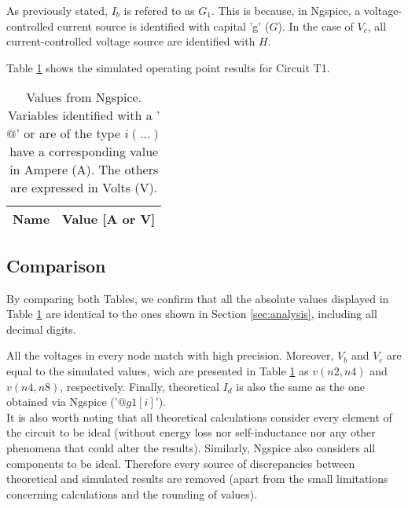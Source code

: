 As previously stated, $I_b$ is refered to as $G_1$. This is because, in Ngspice, a
voltage-controlled current source is identified with capital 'g' ($G$). In the case of
$V_c$, all current-controlled voltage source are identified with $H$.

Table \ref{tab:op} shows the simulated operating point results for Circuit T1.



\begin{table}[h]
	\centering
	\begin{tabular}{|l|r|}
		\hline    
		{\bf Name} & {\bf Value [A or V]} \\ \hline
    		
	\end{tabular}
	
	\caption{Values from Ngspice. Variables identified with a '$@$' or are of the type
	$i(...)$ have a corresponding value in Ampere (A). The others are expressed in Volts (V).}
    
\label{tab:op}
\end{table}




\subsection{Comparison}



By comparing both Tables, we confirm that all the absolute values displayed in Table \ref{tab:op}
are identical to the ones shown in Section \ref{sec:analysis}, including all decimal digits.

All the voltages in every node match with high precision. Moreover, $V_b$ and $V_c$ are
equal to the simulated values, wich are presented in Table \ref{tab:op} as $v(n2,n4)$ and
$v(n4,n8)$, respectively. Finally, theoretical $I_d$ is also the same as the one obtained
via Ngspice ('$@g1[i]$'). \\

It is also worth noting that all theoretical calculations consider every element of the
circuit to be ideal (without energy loss nor self-inductance nor any other phenomena that could
alter the results). Similarly, Ngspice also considers all components to be ideal. Therefore
every source of discrepancies between theoretical and simulated results are removed (apart from
the small limitations concerning calculations and the rounding of values).

